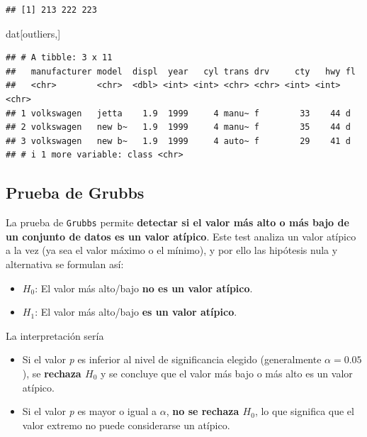 \documentclass[
]{book}
\newenvironment{Shaded}{\begin{snugshade}}{\end{snugshade}}
\newcommand{\NormalTok}[1]{#1}
\providecommand{\tightlist}{%
  \setlength{\itemsep}{0pt}\setlength{\parskip}{0pt}}
\begin{document}
\begin{verbatim}
## [1] 213 222 223
\end{verbatim}

\begin{Shaded}
\begin{Highlighting}[]
\NormalTok{dat[outliers,]}
\end{Highlighting}
\end{Shaded}

\begin{verbatim}
## # A tibble: 3 x 11
##   manufacturer model  displ  year   cyl trans drv     cty   hwy fl   
##   <chr>        <chr>  <dbl> <int> <int> <chr> <chr> <int> <int> <chr>
## 1 volkswagen   jetta    1.9  1999     4 manu~ f        33    44 d    
## 2 volkswagen   new b~   1.9  1999     4 manu~ f        35    44 d    
## 3 volkswagen   new b~   1.9  1999     4 auto~ f        29    41 d    
## # i 1 more variable: class <chr>
\end{verbatim}

\subsection{Prueba de Grubbs}\label{prueba-de-grubbs}

La prueba de \texttt{Grubbs} permite \textbf{detectar si el valor más alto o más bajo de un conjunto de datos es un valor atípico}. Este test analiza un valor atípico a la vez (ya sea el valor máximo o el mínimo), y por ello las hipótesis nula y alternativa se formulan así:

\begin{itemize}
\tightlist
\item
  \(H_0\): El valor más alto/bajo \textbf{no es un valor atípico}.\\
\item
  \(H_1\): El valor más alto/bajo \textbf{es un valor atípico}.
\end{itemize}

La interpretación sería

\begin{itemize}
\tightlist
\item
  Si el valor \emph{p} es inferior al nivel de significancia elegido (generalmente \(\alpha = 0.05\)), se \textbf{rechaza \(H_0\)} y se concluye que el valor más bajo o más alto es un valor atípico.\\
\item
  Si el valor \emph{p} es mayor o igual a \(\alpha\), \textbf{no se rechaza \(H_0\)}, lo que significa que el valor extremo no puede considerarse un atípico.
\end{itemize}
\end{document}
